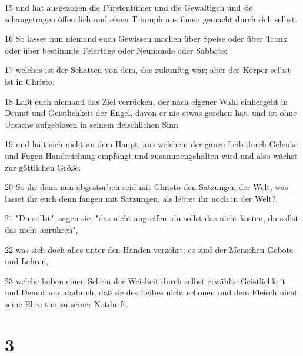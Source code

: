 \par 15 und hat ausgezogen die Fürstentümer und die Gewaltigen und sie schaugetragen öffentlich und einen Triumph aus ihnen gemacht durch sich selbst.
\par 16 So lasset nun niemand euch Gewissen machen über Speise oder über Trank oder über bestimmte Feiertage oder Neumonde oder Sabbate;
\par 17 welches ist der Schatten von dem, das zukünftig war; aber der Körper selbst ist in Christo.
\par 18 Laßt euch niemand das Ziel verrücken, der nach eigener Wahl einhergeht in Demut und Geistlichkeit der Engel, davon er nie etwas gesehen hat, und ist ohne Ursache aufgeblasen in seinem fleischlichen Sinn
\par 19 und hält sich nicht an dem Haupt, aus welchem der ganze Leib durch Gelenke und Fugen Handreichung empfängt und zusammengehalten wird und also wächst zur göttlichen Größe.
\par 20 So ihr denn nun abgestorben seid mit Christo den Satzungen der Welt, was lasset ihr euch denn fangen mit Satzungen, als lebtet ihr noch in der Welt?
\par 21 "Du sollst", sagen sie, "das nicht angreifen, du sollst das nicht kosten, du sollst das nicht anrühren",
\par 22 was sich doch alles unter den Händen verzehrt; es sind der Menschen Gebote und Lehren,
\par 23 welche haben einen Schein der Weisheit durch selbst erwählte Geistlichkeit und Demut und dadurch, daß sie des Leibes nicht schonen und dem Fleisch nicht seine Ehre tun zu seiner Notdurft.

\chapter{3}

